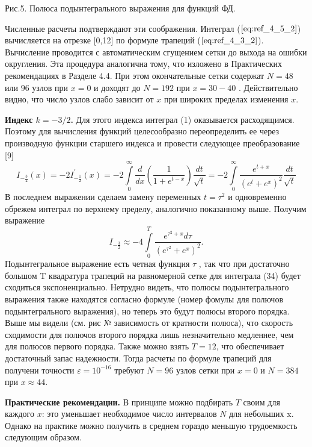 Рис.5. Полюса подынтегрального выражения для функций ФД.

Численные расчеты подтверждают эти соображения. Интеграл ($\ref{eq:ref_4_5_2}$)
вычисляется на отрезке [0,12] по формуле трапеций ($\ref{eq:ref_4_3_2}$). Вычисление
проводится с автоматическим сгущением сетки до выхода на ошибки
округления. Эта процедура аналогична тому, что изложено в Практических
рекомендациях в Разделе 4.4. При этом окончательные сетки содержат $N = 48$
или $96$ узлов при $x = 0$ и доходят до $N =192$ при $x=30-40$ . Действительно
видно, что число узлов слабо зависит от $x$ при широких пределах изменения $x$.


\textbf{Индекс $k = -3/2$.} Для этого индекса интеграл (1) оказывается
расходящимся. Поэтому для вычисления функций целесообразно
переопределить ее через производную функции старшего индекса и провести
следующее преобразование [9]
\begin{equation}
I_{-\frac{3}{2}}(x) = -2I_{-\frac{1}{2}}^{'}(x) = -2\int\limits_0^{\infty}\frac{d}{dx}(\frac{1}{1+e^{t-x}})\frac{dt}{\sqrt{t}} = -2\int\limits_0^{\infty}\frac{e^{t+x}}{(e^t+e^x)^2} \frac{dt}{\sqrt{t}}
\end{equation}
В последнем выражении сделаем замену переменных $t=\tau^2$ и одновременно
обрежем интеграл по верхнему пределу, аналогично показанному выше.
Получим выражение
\begin{equation}
I_{-\frac{3}{2}} \approx -4\int\limits_0^T \frac{e^{\tau^2 + x}d\tau}{(e^{\tau^2}+e^x)^2}.
\end{equation}
Подынтегральное выражение есть четная функция $\tau$ , так что при достаточно
большом T квадратура трапеций на равномерной сетке для интеграла (34)
будет сходиться экспоненциально. Нетрудно видеть, что полюсы подынтегрального выражения также находятся согласно формуле (номер фомулы для полючов подынтегрального выражения), но теперь это будут полюсы второго порядка. Выше мы видели (см. рис № зависимость от кратности полюса), что скорость сходимости для полючов второго порядка лишь незначительно медленнее, чем для полюсов первого порядка. Также можно взять $T = 12$, что обеспечивает достаточный запас надежности. Тогда расчеты по формуле трапеций для получени точности $\varepsilon = 10^{-16}$ требуют $N = 96$ узлов сетки при $x = 0$ и $N = 384$ при $x \approx 44$.

\textbf{Практические рекомендации.} В принципе можно подбирать $T$ своим для каждого $x$: это уменьшает необходимое число интервалов $N$ для небольших x. Однако на практике можно получить в среднем гораздо меньшую трудоемкость следующим образом.

